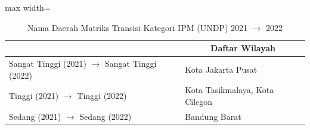 \begin{table}[H]
\centering
\caption{Nama Daerah Matriks Transisi Kategori IPM (UNDP) 2021 \(\rightarrow\) 2022} \label{tab:sample2ipmname2021x2022}
\begin{adjustbox}{max width=\textwidth}
\begin{tabular}{|>{\centering\arraybackslash}p{4cm}|p{10cm}|}
\hline
\multicolumn{1}{|c|}{\textbf{Kategori}} & \multicolumn{1}{c|}{\textbf{Daftar Wilayah}} \\
\hline
Sangat Tinggi (2021) \(\rightarrow\) Sangat Tinggi (2022) & Kota Jakarta Pusat \\
\hline
Tinggi (2021) \(\rightarrow\) Tinggi (2022) & Kota Tasikmalaya, Kota Cilegon \\
\hline
Sedang (2021) \(\rightarrow\) Sedang (2022) & Bandung Barat \\
\hline
\end{tabular}
\end{adjustbox}
\end{table}